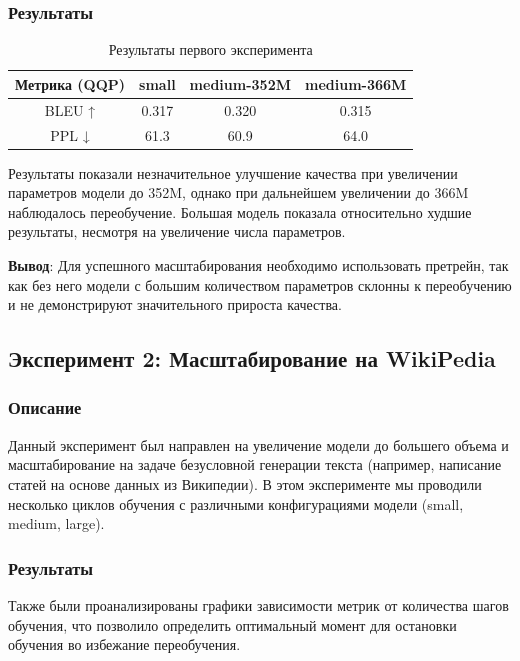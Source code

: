 \documentclass[a4paper, 12pt]{article}
\begin{document}
\subsubsection{Результаты}

\begin{table}[h!]
\caption{Результаты первого эксперимента}
\centering
\begin{tabular}{|c|c|c|c|}
\hline
\textbf{Метрика (QQP)} & small & medium-352M & medium-366M \\ \hline
BLEU ↑ & 0.317 & 0.320 & 0.315 \\ \hline
PPL ↓ & 61.3 & 60.9 & 64.0 \\ \hline
\end{tabular}
\end{table}

Результаты показали незначительное улучшение качества при увеличении параметров модели до 352M, однако при дальнейшем увеличении до 366M наблюдалось переобучение. Большая модель показала относительно худшие результаты, несмотря на увеличение числа параметров.

\textbf{Вывод}: Для успешного масштабирования необходимо использовать претрейн, так как без него модели с большим количеством параметров склонны к переобучению и не демонстрируют значительного прироста качества.

\subsection{Эксперимент 2: Масштабирование на WikiPedia}

\subsubsection{Описание}
Данный эксперимент был направлен на увеличение модели до большего объема и масштабирование на задаче безусловной генерации текста (например, написание статей на основе данных из Википедии). В этом эксперименте мы проводили несколько циклов обучения с различными конфигурациями модели (small, medium, large).

\subsubsection{Результаты}

Также были проанализированы графики зависимости метрик от количества шагов обучения, что позволило определить оптимальный момент для остановки обучения во избежание переобучения.
\end{document}
